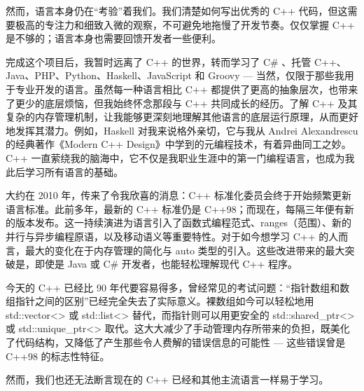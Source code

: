 然而，语言本身仍在“考验”着我们。我们清楚如何写出优秀的 C++ 代码，但这需要极高的专注力和细致入微的观察，不可避免地拖慢了开发节奏。仅仅掌握 C++ 是不够的；语言本身也需要回馈开发者一些便利。

完成这个项目后，我暂时远离了 C++ 的世界，转而学习了 C\# 、托管 C++、Java、PHP、Python、Haskell、JavaScript 和 Groovy --- 当然，仅限于那些我用于专业开发的语言。虽然每一种语言相比 C++ 都提供了更高的抽象层次，也带来了更少的底层烦恼，但我始终怀念那段与 C++ 共同成长的经历。了解 C++ 及其复杂的内存管理机制，让我能够更深刻地理解其他语言的底层运行原理，从而更好地发挥其潜力。例如，Haskell 对我来说格外亲切，它与我从 Andrei Alexandrescu 的经典著作《Modern C++ Design》中学到的元编程技术，有着异曲同工之妙。C++ 一直萦绕我的脑海中，它不仅是我职业生涯中的第一门编程语言，也成为我此后学习所有语言的基础。

大约在 2010 年，传来了令我欣喜的消息：C++ 标准化委员会终于开始频繁更新语言标准。此前多年，最新的 C++ 标准仍是 C++98；而现在，每隔三年便有新的版本发布。这一持续演进为语言引入了函数式编程范式、ranges（范围）、新的并行与异步编程原语，以及移动语义等重要特性。对于如今想学习 C++ 的人而言，最大的变化在于内存管理的简化与 auto 类型的引入。这些改进带来的最大突破是，即使是 Java 或 C\# 开发者，也能轻松理解现代 C++ 程序。

今天的 C++ 已经比 90 年代要容易得多，曾经常见的考试问题：“指针数组和数组指针之间的区别”已经完全失去了实际意义。裸数组如今可以轻松地用 std::vector<> 或 std::list<> 替代，而指针则可以用更安全的 std::shared\_ptr<> 或 std::unique\_ptr<> 取代。这大大减少了手动管理内存所带来的负担，既美化了代码结构，又降低了产生那些令人费解的错误信息的可能性 --- 这些错误曾是 C++98 的标志性特征。

然而，我们也还无法断言现在的 C++ 已经和其他主流语言一样易于学习。
























